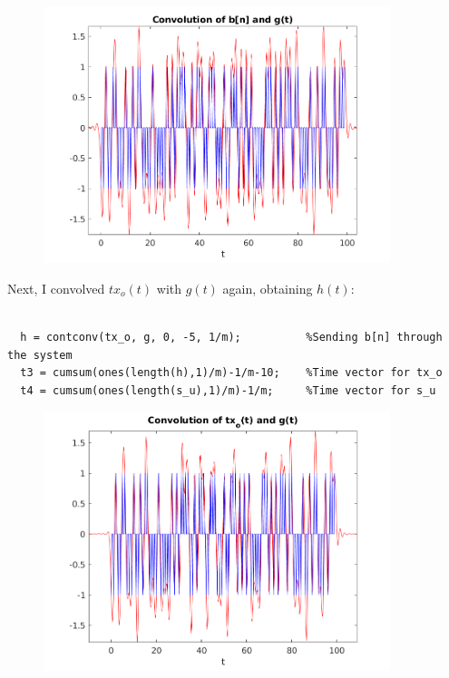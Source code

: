 \documentclass[a4paper,11pt]{article}
\begin{document}
\begin{figure}[!hp]
    \begin{center}
      \includegraphics[width=0.9\textwidth]{images/exercise4.png}
    \end{center}
\end{figure}

\newpage

Next, I convolved $tx_o(t)$ with $g(t)$ again, obtaining $h(t)$:

\bigskip

\begin{lstlisting}

  h = contconv(tx_o, g, 0, -5, 1/m);          %Sending b[n] through the system
  t3 = cumsum(ones(length(h),1)/m)-1/m-10;    %Time vector for tx_o
  t4 = cumsum(ones(length(s_u),1)/m)-1/m;     %Time vector for s_u

\end{lstlisting}

\bigskip

\begin{figure}[!hp]
    \begin{center}
      \includegraphics[width=0.9\textwidth]{images/exercise5.png}
    \end{center}
\end{figure}
\end{document}
